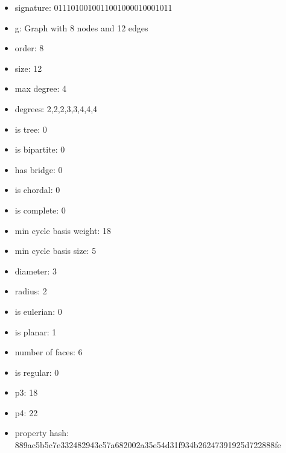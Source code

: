 \begin{itemize}
\item signature: 0111010010011001000010001011
\item g: Graph with 8 nodes and 12 edges
\item order: 8
\item size: 12
\item max degree: 4
\item degrees: 2,2,2,3,3,4,4,4
\item is tree: 0
\item is bipartite: 0
\item has bridge: 0
\item is chordal: 0
\item is complete: 0
\item min cycle basis weight: 18
\item min cycle basis size: 5
\item diameter: 3
\item radius: 2
\item is eulerian: 0
\item is planar: 1
\item number of faces: 6
\item is regular: 0
\item p3: 18
\item p4: 22
\item property hash: 889ac5b5c7e332482943c57a682002a35e54d31f934b26247391925d722888fe
\end{itemize}
\newpage
\begin{figure}
\end{figure}
